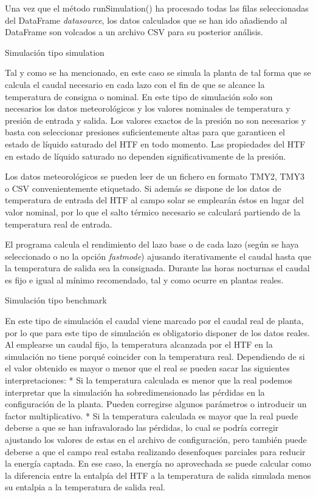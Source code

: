 \documentclass[12pt]{report} %
\begin{document}
Una vez que el método runSimulation() ha procesado todas las filas seleccionadas del DataFrame \emph{datasource}, los datos calculados que se han ido añadiendo al DataFrame son volcados a un archivo CSV para su posterior análisis.

\hypertarget{simulaciuxf3n-tipo-simulation}{Simulación tipo simulation}

Tal y como se ha mencionado, en este caso se simula la planta de tal forma que se calcula el caudal necesario en cada lazo con el fin de que se alcance la temperatura de consigna o nominal. En este tipo de simulación solo son necesarios los datos meteorológicos y los valores nominales de temperatura y presión de entrada y salida. Los valores exactos de la presión no son necesarios y basta con seleccionar presiones suficientemente altas para que garanticen el estado de líquido
saturado del HTF en todo momento. Las propiedades del HTF en estado de líquido saturado no dependen significativamente de la presión.

Los datos meteorológicos se pueden leer de un fichero en formato TMY2, TMY3 o CSV convenientemente etiquetado. Si además se dispone de los datos de temperatura de entrada del HTF al campo solar se emplearán éstos en lugar del valor nominal, por lo que el salto térmico necesario se calculará partiendo de la temperatura real de entrada.

El programa calcula el rendimiento del lazo base o de cada lazo (según se haya seleccionado o no la opción \emph{fastmode}) ajusando iterativamente el caudal hasta que la temperatura de salida sea la consignada. Durante las horas nocturnas el caudal es fijo e igual al mínimo recomendado, tal y como ocurre en plantas reales. 

\hypertarget{simulaciuxf3n-tipo-benchmark}{Simulación tipo benchmark}

En este tipo de simulación el caudal viene marcado por el caudal real de planta, por lo que para este tipo de simulación es obligatorio disponer de los datos reales. Al emplearse un caudal fijo, la temperatura alcanzada por el HTF en la simulación no tiene porqué coincider con la temperatura real. Dependiendo de si el valor obtenido es mayor o menor que el real se pueden sacar las siguientes interpretaciones: 
* Si la  temperatura calculada es menor que la real podemos interpretar que la simulación ha sobredimensionado las pérdidas en la configuración de la planta. Pueden corregirse algunos parámetros o introducir un factor multiplicativo. 
* Si la temperatura calculada es mayor que la real puede deberse a que se han infravalorado las pérdidas, lo cual se podría corregir ajustando los valores de estas en el archivo de configuración, pero también puede deberse a que el campo real estaba realizando desenfoques parciales para reducir la energía captada. En ese caso, la energía no aprovechada se puede calcular como la diferencia entre la entalpía del HTF a la temperatura de salida simulada menos su entalpia a la temperatura de salida real.
\end{document}
